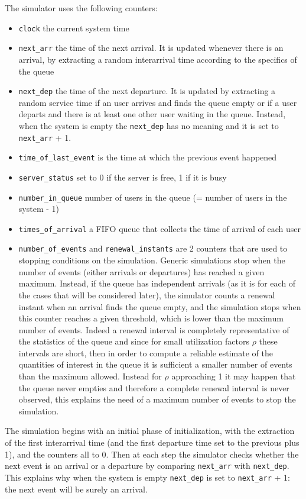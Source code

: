 \documentclass[10pt]{article}
\begin{document}
The simulator uses the following counters:
\begin{itemize}
\item \texttt{clock} the current system time
\item \texttt{next\_arr} the time of the next arrival. It is updated whenever there is an arrival, by extracting a random interarrival time according to the specifics of the queue
\item \texttt{next\_dep} the time of the next departure. It is updated by extracting a random service time if an user arrives and finds the queue empty or if a user departs and there is at least one other user waiting in the queue. Instead, when the system is empty the \texttt{next\_dep} has no meaning and it is set to \texttt{next\_arr} + 1.
\item \texttt{time\_of\_last\_event} is the time at which the previous event happened
\item \texttt{server\_status} set to 0 if the server is free, 1 if it is busy
\item \texttt{number\_in\_queue} number of users in the queue (= number of users in the system - 1)
\item \texttt{times\_of\_arrival} a FIFO queue that collects the time of arrival of each user
\item \texttt{number\_of\_events} and \texttt{renewal\_instants} are 2 counters that are used to stopping conditions on the simulation. Generic simulations stop when the number of events (either arrivals or departures) has reached a given maximum. Instead, if the queue has independent arrivals (as it is for each of the cases that will be considered later), the simulator counts a renewal instant when an arrival finds the queue empty, and the simulation stops when this counter reaches a given threshold, which is lower than the maximum number of events. Indeed a renewal interval is completely representative of the statistics of the queue and since for small utilization factors $\rho$ these intervals are short, then in order to compute a reliable estimate of the quantities of interest in the queue it is sufficient a smaller number of events than the maximum allowed. Instead for $\rho$ approaching 1 it may happen that the queue never empties and therefore a complete renewal interval is never observed, this explains the need of a maximum number of events to stop the simulation. 
\end{itemize}

The simulation begins with an initial phase of initialization, with the extraction of the first interarrival time (and the first departure time set to the previous plus 1), and the counters all to 0. Then at each step the simulator checks whether the next event is an arrival or a departure by comparing \texttt{next\_arr} with \texttt{next\_dep}. This explains why when the system is empty \texttt{next\_dep} is set to \texttt{next\_arr} + 1: the next event will be surely an arrival. 
\end{document}
